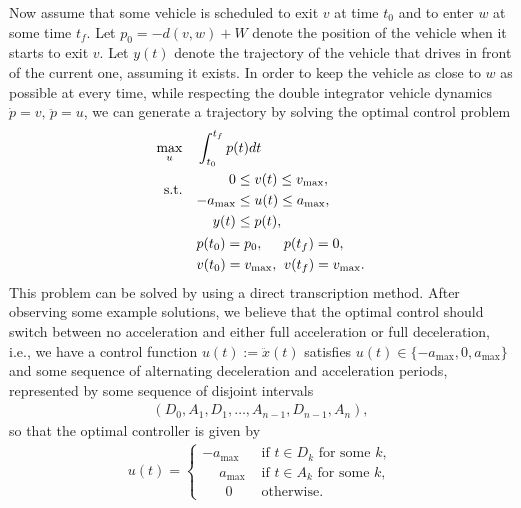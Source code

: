 \documentclass[a4paper]{article}
\theoremstyle{definition}
\theoremstyle{plain}
\begin{document}
Now assume that some vehicle is scheduled to exit $v$ at time $t_{0}$ and to
enter $w$ at some time $t_{f}$. Let $p_{0} = -d(v,w) + W$ denote the position of
the vehicle when it starts to exit $v$. Let $y(t)$ denote the trajectory of the
vehicle that drives in front of the current one, assuming it exists. In order to
keep the vehicle as close to $w$ as possible at every time, while respecting
the double integrator vehicle dynamics $\dot{p} = v, \, \ddot{p} = u$, we can
generate a trajectory by solving the optimal control problem
\begin{equation}
  \label{eq:optimal_control}
  \begin{aligned}
  \max_{u}    \quad & \int_{t_{0}}^{t_{f}} p(t) dt \\
  \begin{alignedat}{2}\text{s.t.}\\ {}\end{alignedat} \quad &\begin{alignedat}{2}
                     0 \leq \; &v(t) \leq v_{\max} , \\
                     {-a_{\max}} \leq \; &u(t) \leq a_{\max} , \\
                    y(t) \leq \; & p(t) , \\
                    \end{alignedat} \\
                    &\begin{alignedat}[t]{2}
                    & p(t_{0}) = p_{0} , &&  p(t_{f}) = 0 , \\
                    & v(t_{0}) = v_{\max} , \;\; && v(t_{f}) = v_{\max} .
                    \end{alignedat}
  \end{aligned}
\end{equation}
%
This problem can be solved by using a direct transcription method. After
observing some example solutions, we believe that the optimal control should
switch between no acceleration and either full acceleration or full
deceleration, i.e., we have a control function $u(t) := \ddot{x}(t)$ satisfies
$u(t) \in \{-a_{\max}, 0, a_{\max}\}$ and some sequence of alternating
deceleration and acceleration periods, represented by some sequence of disjoint
intervals
\begin{align*}
  (D_{0}, A_{1}, D_{1}, \dots, A_{n-1}, D_{n-1}, A_{n}) ,
\end{align*}
so that the optimal controller is given by
\begin{align*}
  u(t) = \begin{cases}
           {-a_{\max}} &\text{ if } t \in D_{k} \text{ for some } k , \\
           \phantom{-} a_{\max}   &\text{ if } t \in A_{k} \text{ for some } k , \\
           \phantom{-} \;\, 0 &\text{ otherwise. }
         \end{cases}
\end{align*}
\end{document}
